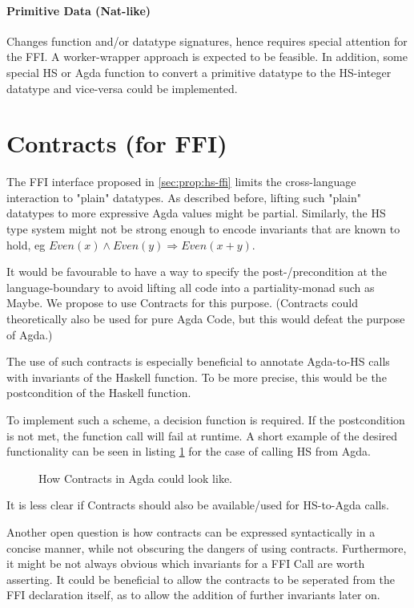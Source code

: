 \documentclass[12pt, a4paper, twoside]{report}
\begin{document}
\paragraph{Primitive Data (Nat-like)}
Changes function and/or datatype signatures, hence requires special attention for the FFI.
A worker-wrapper approach is expected to be feasible. In addition, some special
HS or Agda function to convert a primitive datatype to the HS-integer datatype and vice-versa could be
implemented.

\section{Contracts (for FFI)}
The FFI interface proposed in \ref{sec:prop:hs-ffi} limits the cross-language interaction
to "plain" datatypes. As described before, lifting such "plain" datatypes to more expressive
Agda values might be partial. Similarly, the HS type system might not be strong enough
to encode invariants that are known to hold, eg $Even(x) \land Even(y) \Rightarrow Even(x + y)$.

It would be favourable to have a way to specify the post-/precondition at the language-boundary
to avoid lifting all code into a partiality-monad such as Maybe.
We propose to use Contracts for this purpose. (Contracts could
theoretically also be used for pure Agda Code, but this would defeat the purpose of Agda.)

The use of such contracts is especially beneficial to annotate Agda-to-HS calls with invariants
of the Haskell function. To be more precise, this would be the postcondition of the Haskell function.

To implement such a scheme, a decision function is required. If the postcondition is not met,
the function call will fail at runtime. A short example of the desired functionality can be seen in listing \ref{lst:agda-con-ex}
for the case of calling HS from Agda.


\begin{figure}

\caption{How Contracts in Agda could look like.}
\label{lst:agda-con-ex}
\end{figure}

It is less clear if Contracts should also be available/used for HS-to-Agda calls.

Another open question is how
contracts can be expressed syntactically in a concise manner, while not obscuring the dangers of using contracts.
Furthermore, it might be not always obvious which invariants for a FFI Call are worth asserting. It could be beneficial
to allow the contracts to be seperated from the FFI declaration itself, as to allow the addition of further invariants later on.
\end{document}
